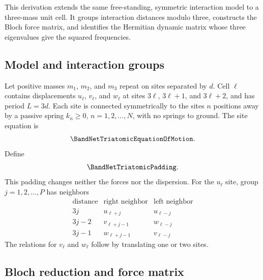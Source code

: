
This derivation extends the same free-standing, symmetric interaction model to
a three-mass unit cell. It groups interaction distances modulo three, constructs
the Bloch force matrix, and identifies the Hermitian dynamic matrix whose three
eigenvalues give the squared frequencies.

\subsection{Model and interaction groups}

Let positive masses $m_1$, $m_2$, and $m_3$ repeat on sites separated by $d$.
Cell $\ell$ contains displacements $u_\ell$, $v_\ell$, and $w_\ell$ at sites
$3\ell$, $3\ell+1$, and $3\ell+2$, and has period $L=3d$. Each site is connected
symmetrically to the sites $n$ positions away by a passive spring $k_n\geq0$,
$n=1,2,\ldots,N$, with no springs to ground. The site equation is
\begin{equation}
    \BandNetTriatomicEquationOfMotion.
    \label{eq:tri-site}
\end{equation}
Define
\begin{equation}
    \BandNetTriatomicPadding.
    \label{eq:tri-padding}
\end{equation}
This padding changes neither the forces nor the dispersion. For the $u_\ell$
site, group $j=1,2,\ldots,P$ has neighbors
\begin{equation*}
\begin{array}{c|cc}
\text{distance}&\text{right neighbor}&\text{left neighbor}\\\hline
3j&u_{\ell+j}&u_{\ell-j}\\
3j-2&v_{\ell+j-1}&w_{\ell-j}\\
3j-1&w_{\ell+j-1}&v_{\ell-j}
\end{array}
\end{equation*}
The relations for $v_\ell$ and $w_\ell$ follow by translating one or two sites.

\subsection{Bloch reduction and force matrix}

